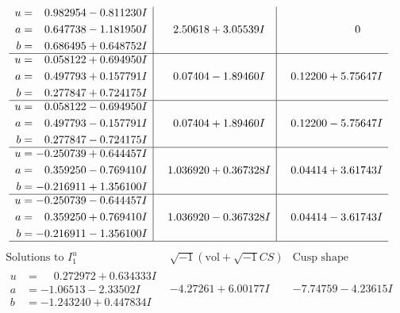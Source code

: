 \documentclass[1p]{elsarticle_modified}
\theoremstyle{definition}
\newcommand{\I}{\sqrt{-1}}
\begin{document}
$$\begin{array}{c|c|c}
\begin{aligned}
u &= \phantom{-}0.982954 - 0.811230 I \\
a &= \phantom{-}0.647738 - 1.181950 I \\
b &= \phantom{-}0.686495 + 0.648752 I\end{aligned}
 & \phantom{-}2.50618 + 3.05539 I & \phantom{-0.000000 } 0 \\ \hline\begin{aligned}
u &= \phantom{-}0.058122 + 0.694950 I \\
a &= \phantom{-}0.497793 + 0.157791 I \\
b &= \phantom{-}0.277847 + 0.724175 I\end{aligned}
 & \phantom{-}0.07404 - 1.89460 I & \phantom{-}0.12200 + 5.75647 I \\ \hline\begin{aligned}
u &= \phantom{-}0.058122 - 0.694950 I \\
a &= \phantom{-}0.497793 - 0.157791 I \\
b &= \phantom{-}0.277847 - 0.724175 I\end{aligned}
 & \phantom{-}0.07404 + 1.89460 I & \phantom{-}0.12200 - 5.75647 I \\ \hline\begin{aligned}
u &= -0.250739 + 0.644457 I \\
a &= \phantom{-}0.359250 - 0.769410 I \\
b &= -0.216911 + 1.356100 I\end{aligned}
 & \phantom{-}1.036920 + 0.367328 I & \phantom{-}0.04414 + 3.61743 I \\ \hline\begin{aligned}
u &= -0.250739 - 0.644457 I \\
a &= \phantom{-}0.359250 + 0.769410 I \\
b &= -0.216911 - 1.356100 I\end{aligned}
 & \phantom{-}1.036920 - 0.367328 I & \phantom{-}0.04414 - 3.61743 I\\
 \hline 
 \end{array}$$\newpage$$\begin{array}{c|c|c}  
\text{Solutions to }I^u_{1}& \I (\text{vol} + \sqrt{-1}CS) & \text{Cusp shape}\\
 \hline 
\begin{aligned}
u &= \phantom{-}0.272972 + 0.634333 I \\
a &= -1.06513 - 2.33502 I \\
b &= -1.243240 + 0.447834 I\end{aligned}
 & -4.27261 + 6.00177 I & -7.74759 - 4.23615 I \\ \hline\begin{aligned}

\end{aligned}
\end{array}$$
\end{document}
